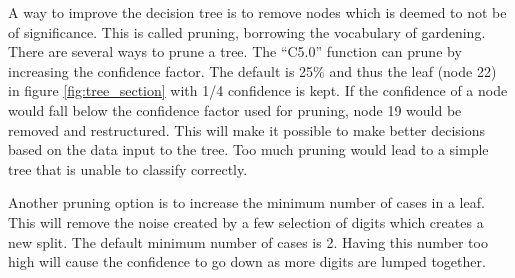 A way to improve the decision tree is to remove nodes which is deemed to not be of significance.
This is called pruning, borrowing the vocabulary of gardening.
There are several ways to prune a tree.
The ``C5.0'' function can prune by increasing the confidence factor. 
The default is 25\% and thus the leaf (node 22) in figure \ref{fig:tree_section} with 1/4 confidence is kept.
If the confidence of a node would fall below the confidence factor used for pruning, node 19 would be removed and restructured.
This will make it possible to make better decisions based on the data input to the tree.
Too much pruning would lead to a simple tree that is unable to classify correctly.

Another pruning option is to increase the minimum number of cases in a leaf. 
This will remove the noise created by a few selection of digits which creates a new split.
The default minimum number of cases is 2.
Having this number too high will cause the confidence to go down as more digits are lumped together. 